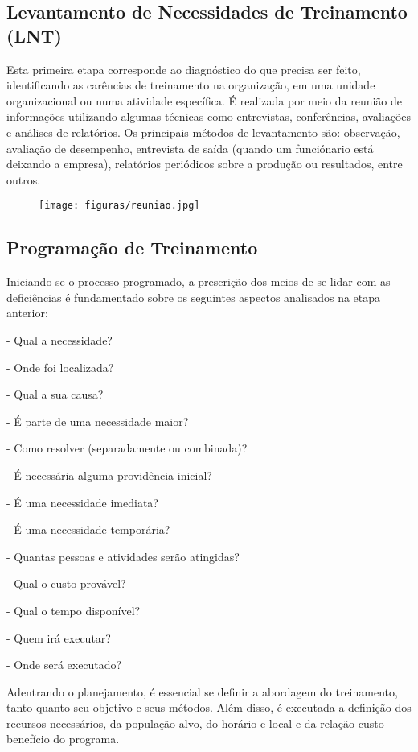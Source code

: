 \subsection{Levantamento de Necessidades de Treinamento (LNT)}
Esta primeira etapa corresponde ao diagnóstico do que precisa ser feito, identificando as carências de treinamento na organização, em uma unidade organizacional ou numa atividade específica. É realizada por meio da reunião de informações utilizando algumas técnicas como entrevistas, conferências, avaliações e análises de relatórios.
Os principais métodos de levantamento são: observação, avaliação de desempenho, entrevista de saída (quando um funciónario está deixando a empresa), relatórios periódicos sobre a produção ou resultados, entre outros.

\begin{figure}[h]

\centering
\texttt{[image: figuras/reuniao.jpg]}
\end{figure}

\subsection{Programação de Treinamento}
Iniciando-se o processo programado, a prescrição dos meios de se lidar com as deficiências é fundamentado sobre os seguintes aspectos analisados na etapa anterior: 

- Qual a necessidade?

- Onde foi localizada?

- Qual a sua causa?

- É parte de uma necessidade maior?

- Como resolver (separadamente ou combinada)?

- É necessária alguma providência inicial?

- É uma necessidade imediata?

- É uma necessidade temporária?

- Quantas pessoas e atividades serão atingidas?

- Qual o custo provável?

- Qual o tempo disponível?

- Quem irá executar?

- Onde será executado?

Adentrando o planejamento, é essencial se definir a abordagem do treinamento, tanto quanto seu objetivo e seus métodos. Além disso, é executada a definição dos recursos necessários, da população alvo, do horário e local e da relação custo benefício do programa.


